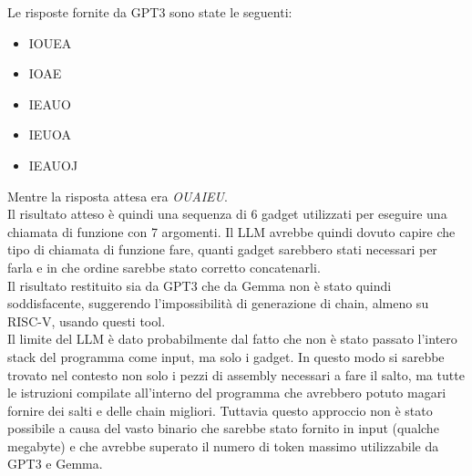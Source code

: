 \vspace{1cm}
\FloatBarrier
Le risposte fornite da GPT3 sono state le seguenti:
\begin{itemize}
    \item IOUEA
    \item IOAE
    \item IEAUO
    \item IEUOA
    \item IEAUOJ
\end{itemize}
Mentre la risposta attesa era \textit{OUAIEU}.\\
\newline
Il risultato atteso è quindi una sequenza di 6 gadget utilizzati per eseguire una chiamata  di funzione con 7 argomenti. Il LLM avrebbe quindi dovuto capire che tipo di chiamata di funzione fare, quanti gadget sarebbero stati necessari per farla e in che ordine sarebbe stato corretto concatenarli.\\
Il risultato restituito sia da GPT3 che da Gemma non è stato quindi soddisfacente, suggerendo l'impossibilità di generazione di chain, almeno su RISC-V, usando questi tool.
\\
\newline
Il limite del LLM è dato probabilmente dal fatto che non è stato passato l'intero stack del programma come input, ma solo i gadget. In questo modo si sarebbe trovato nel contesto non solo i pezzi di assembly necessari a fare il salto, ma tutte le istruzioni compilate all'interno del programma che avrebbero potuto magari fornire dei salti e delle chain migliori. Tuttavia questo approccio non è stato possibile a causa del vasto binario che sarebbe stato fornito in input (qualche megabyte) e che avrebbe superato il numero di token massimo utilizzabile da GPT3 e Gemma.
